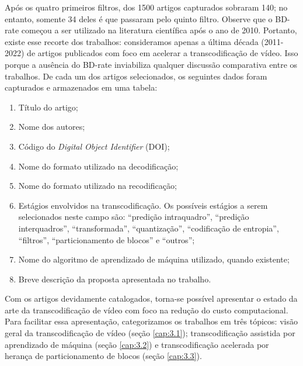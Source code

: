 Após os quatro primeiros filtros, dos 1500 artigos capturados sobraram 140; no entanto, somente 34 deles é que passaram pelo quinto filtro. Observe que o BD-rate começou a ser utilizado na literatura científica após o ano de 2010. Portanto, existe esse recorte dos trabalhos: consideramos apenas a última década (2011-2022) de artigos publicados com foco em acelerar a transcodificação de vídeo. Isso porque a ausência do BD-rate inviabiliza qualquer discussão comparativa entre os trabalhos. De cada um dos artigos selecionados, os seguintes dados foram capturados e armazenados em uma tabela:

\begin{enumerate}[1.]
    \item Título do artigo;
    
    \item Nome dos autores;
    
    \item Código do \textit{Digital Object Identifier} (DOI);
    
    \item Nome do formato utilizado na decodificação;
    
    \item Nome do formato utilizado na recodificação;
    
    \item Estágios envolvidos na transcodificação. Os possíveis estágios a serem selecionados neste campo são: ``predição intraquadro'', ``predição interquadros'', ``transformada'', ``quantização'', ``codificação de entropia'', ``filtros'', ``particionamento de blocos'' e ``outros'';
    
    \item Nome do algoritmo de aprendizado de máquina utilizado, quando existente;
    
    \item Breve descrição da proposta apresentada no trabalho.
\end{enumerate}

Com os artigos devidamente catalogados, torna-se possível apresentar o estado da arte da transcodificação de vídeo com foco na redução do custo computacional. Para facilitar essa apresentação, categorizamos os trabalhos em três tópicos: visão geral da transcodificação de vídeo (seção \ref{cap:3.1}); transcodificação assistida por aprendizado de máquina (seção \ref{cap:3.2}) e transcodificação acelerada por herança de particionamento de blocos (seção \ref{cap:3.3}).

